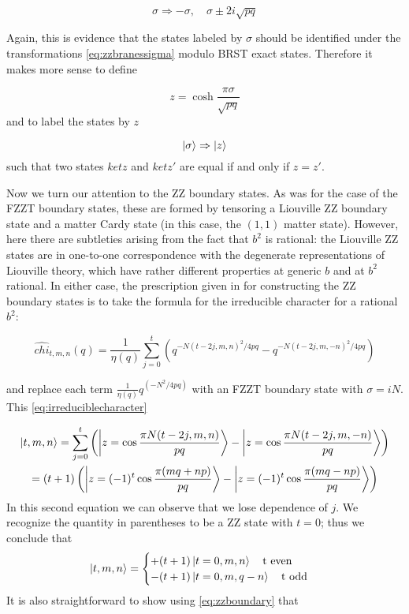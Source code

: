 \begin{equation}
\sigma \Rightarrow -\sigma, \quad \sigma\pm 2i\sqrt{pq}
\label{eq:zzbranessigma}
\end{equation}

Again, this is evidence that the states labeled by $\sigma$ should be identified under the transformations \eqref{eq:zzbranessigma} modulo BRST exact states. Therefore it makes more sense to define

\begin{equation}
z = \cosh\frac{\pi\sigma}{\sqrt{pq}}
\end{equation}
and to label the states by $z$

\begin{equation}
\ket{\sigma}\Rightarrow\ket{z}
\end{equation}
such that two states $ket{z}$ and $ket{z'}$ are equal if and only if $z=z'$.

Now we turn our attention to the ZZ boundary states. As was for the case of the FZZT boundary states, these are formed by tensoring a Liouville ZZ boundary state and a matter Cardy state (in this case, the $(1,1)$ matter state). However, here there are subtleties arising from the fact that $b^2$ is rational: the Liouville ZZ states are in one-to-one correspondence
with the degenerate representations of Liouville theory, which have rather different properties at generic $b$ and at $b^2$ rational. In either case, the prescription given in \cite{Zamolodchikov01} for constructing the ZZ boundary states is to take the formula for the irreducible character for a rational $b^2$:

\begin{equation}
\hat{chi}_{t,m,n}(q) = \frac{1}{\eta(q)}\sum_{j=0}^t\left(q^{-N(t-2j,m,n)^2/4pq}-q^{-N(t-2j,m,-n)^2/4pq}\right)
\label{eq:irreduciblecharacter}
\end{equation}

and replace each term $\frac{1}{\eta(q)}q^(-N^2/4pq)$ with an FZZT boundary state with $\sigma=iN$. This \eqref{eq:irreduciblecharacter}

\begin{gather}
\ket{t,m,n} = \sum_{j=0}^t\left(\ket{z=\cos\frac{\pi N(t-2j,m,n)}{pq}} - \ket{z=\cos\frac{\pi N(t-2j,m,-n)}{pq}}\right)\nonumber \\
= (t+1)\left(\ket{z=(-1)^t\cos\frac{\pi(mq+np)}{pq}} - \ket{z=(-1)^t\cos\frac{\pi(mq-np)}{pq}}\right)
\label{eq:zzbrane}
\end{gather}
In this second equation we can observe that we lose dependence of $j$. We recognize the quantity in parentheses to be a ZZ state with $t=0$; thus we conclude that
\begin{equation}
\ket{t,m,n} = 
\begin{cases}
+(t+1)\ket{t=0,m,n}\quad \textnormal{t even}\\
-(t+1)\ket{t=0,m,q-n}\quad \textnormal{t odd}
\end{cases}
\label{eq:zzbranescases}
\end{equation}
It is also straightforward to show using \eqref{eq:zzboundary} that

